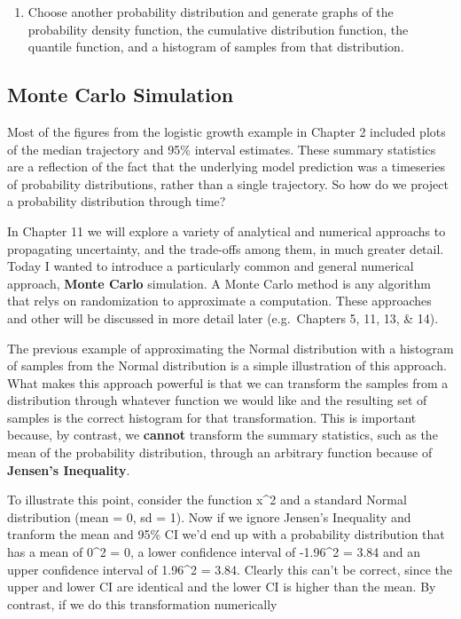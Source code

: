 \documentclass[]{article}
\providecommand{\tightlist}{%
  \setlength{\itemsep}{0pt}\setlength{\parskip}{0pt}}
\begin{document}
\begin{enumerate}
\def\labelenumi{\arabic{enumi}.}
\setcounter{enumi}{1}
\tightlist
\item
  Choose another probability distribution and generate graphs of the
  probability density function, the cumulative distribution function,
  the quantile function, and a histogram of samples from that
  distribution.
\end{enumerate}

\subsection{Monte Carlo Simulation}\label{monte-carlo-simulation}

Most of the figures from the logistic growth example in Chapter 2
included plots of the median trajectory and 95\% interval estimates.
These summary statistics are a reflection of the fact that the
underlying model prediction was a timeseries of probability
distributions, rather than a single trajectory. So how do we project a
probability distribution through time?

In Chapter 11 we will explore a variety of analytical and numerical
approachs to propagating uncertainty, and the trade-offs among them, in
much greater detail. Today I wanted to introduce a particularly common
and general numerical approach, \textbf{Monte Carlo} simulation. A Monte
Carlo method is any algorithm that relys on randomization to approximate
a computation. These approaches and other will be discussed in more
detail later (e.g.~Chapters 5, 11, 13, \& 14).

The previous example of approximating the Normal distribution with a
histogram of samples from the Normal distribution is a simple
illustration of this approach. What makes this approach powerful is that
we can transform the samples from a distribution through whatever
function we would like and the resulting set of samples is the correct
histogram for that transformation. This is important because, by
contrast, we \textbf{cannot} transform the summary statistics, such as
the mean of the probability distribution, through an arbitrary function
because of \textbf{Jensen's Inequality}.

To illustrate this point, consider the function x\^{}2 and a standard
Normal distribution (mean = 0, sd = 1). Now if we ignore Jensen's
Inequality and tranform the mean and 95\% CI we'd end up with a
probability distribution that has a mean of 0\^{}2 = 0, a lower
confidence interval of -1.96\^{}2 = 3.84 and an upper confidence
interval of 1.96\^{}2 = 3.84. Clearly this can't be correct, since the
upper and lower CI are identical and the lower CI is higher than the
mean. By contrast, if we do this transformation numerically
\end{document}
